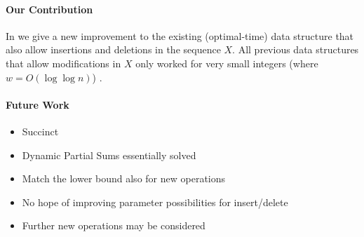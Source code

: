 \paragraph{Our Contribution} 
In  we give a new improvement to the existing (optimal-time) data structure that also allow insertions and deletions in the sequence $X$. All previous data structures that allow modifications in $X$ only worked for very small integers (where $w = O(\log \log n)$) . 

\paragraph{Future Work}
\begin{itemize}
    \item Succinct
    \item Dynamic Partial Sums essentially solved
    \item Match the lower bound also for new operations
    \item No hope of improving parameter possibilities for insert/delete
    \item Further new operations may be considered
\end{itemize}

